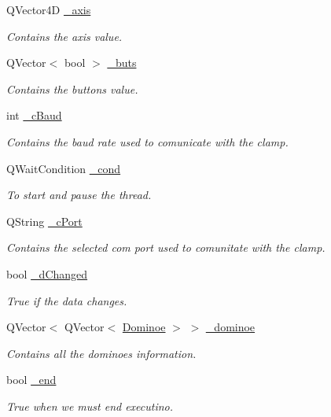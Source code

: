 \begin{DoxyCompactItemize}
Q\+Vector4\+D \hyperlink{a00009_a4ddc59272c23925f921e20ee630804c2}{\+\_\+axis}
\begin{DoxyCompactList}\small\item\em Contains the axis value. \end{DoxyCompactList}\item 
Q\+Vector$<$ bool $>$ \hyperlink{a00009_a6f956f7e0f2953e213ff95fb64857ab0}{\+\_\+buts}
\begin{DoxyCompactList}\small\item\em Contains the buttons value. \end{DoxyCompactList}\item 
int \hyperlink{a00009_a9fccfd415e2e55c8abef7fcc6535af30}{\+\_\+c\+Baud}
\begin{DoxyCompactList}\small\item\em Contains the baud rate used to comunicate with the clamp. \end{DoxyCompactList}\item 
Q\+Wait\+Condition \hyperlink{a00009_afcb93c09acd7fecf47d92996a297365c}{\+\_\+cond}
\begin{DoxyCompactList}\small\item\em To start and pause the thread. \end{DoxyCompactList}\item 
Q\+String \hyperlink{a00009_ab52437b31a433c427a6c050f2b1cc959}{\+\_\+c\+Port}
\begin{DoxyCompactList}\small\item\em Contains the selected com port used to comunitate with the clamp. \end{DoxyCompactList}\item 
bool \hyperlink{a00009_a2b6ccfeacbb3cc9ac5c34549b9aa3f11}{\+\_\+d\+Changed}
\begin{DoxyCompactList}\small\item\em True if the data changes. \end{DoxyCompactList}\item 
Q\+Vector$<$ Q\+Vector$<$ \hyperlink{a00002}{Dominoe} $>$ $>$ \hyperlink{a00009_ad06a87d9f22914fd2597c939a3eb61cd}{\+\_\+dominoe}
\begin{DoxyCompactList}\small\item\em Contains all the dominoes information. \end{DoxyCompactList}\item 
bool \hyperlink{a00009_acca9896d1a2d1ef68527e6834f81c76c}{\+\_\+end}
\begin{DoxyCompactList}\small\item\em True when we must end executino. \end{DoxyCompactList}\item 

\end{DoxyCompactItemize}
